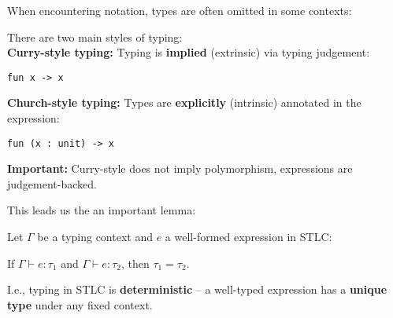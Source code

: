 When encountering notation, types are often omitted in some contexts:
\begin{Def}

There are two main styles of typing:\\

\noindent
 \textbf{Curry-style typing:} Typing is \textbf{implied} (extrinsic) via typing judgement: 
    \begin{lstlisting}[numbers=none, mathescape=true]
    fun x -> x
    \end{lstlisting}
    
\vspace{1em}
\noindent
\textbf{Church-style typing:} Types are \textbf{explicitly} (intrinsic) annotated in the expression:
    \begin{lstlisting}[numbers=none, mathescape=true]
    fun (x : unit) -> x
    \end{lstlisting}


\noindent
\textbf{Important:} Curry-style does not imply polymorphism, expressions are judgement-backed.

\end{Def}

\noindent 
This leads us the an important lemma:
\begin{Def}

    Let $\Gamma$ be a typing context and $e$ a well-formed expression in STLC:
    \Large
    \begin{center}
        If $\Gamma \vdash e : \tau_1$ and $\Gamma \vdash e : \tau_2$, then $\tau_1 = \tau_2$.
    
    \end{center}
    \normalsize

    \noindent
    I.e., typing in STLC is \textbf{deterministic} -- a well-typed expression has a \textbf{unique type} under any fixed context.
    
    \end{Def}

    \newpage 

